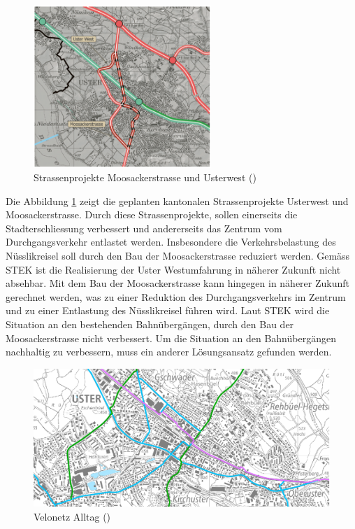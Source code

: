 \begin{figure}[h!]
	\centering
	\includegraphics[width=0.6\textwidth]{figures/f-04-04-UsterWest-Moosackerstr}
	\caption[Strassenprojekte Uster]{Strassenprojekte Moosackerstrasse und Usterwest (\cite{STEK})}
	\label{img:Strassenprojekte}
\end{figure}

Die Abbildung \ref{img:Strassenprojekte} zeigt die geplanten kantonalen Strassenprojekte Usterwest und Moosackerstrasse. Durch diese Strassenprojekte, sollen einerseits die Stadterschliessung verbessert und andererseits das Zentrum vom Durchgangsverkehr entlastet werden. Insbesondere die Verkehrsbelastung des Nüsslikreisel soll durch den Bau der Moosackerstrasse reduziert werden. Gemäss STEK ist die Realisierung der Uster Westumfahrung in näherer Zukunft nicht absehbar. Mit dem Bau der Moosackerstrasse kann hingegen in näherer Zukunft gerechnet werden, was zu einer Reduktion des Durchgangsverkehrs im Zentrum und zu einer Entlastung des Nüsslikreisel führen wird. Laut STEK wird die Situation an den bestehenden Bahnübergängen, durch den Bau der Moosackerstrasse nicht verbessert. Um die Situation an den Bahnübergängen nachhaltig zu verbessern, muss ein anderer Lösungsansatz gefunden werden. 

\begin{figure}[h!]
	\centering
	\includegraphics[width=\textwidth]{figures/f-04-01-Veloweg-Alltag}
	\caption[Velonetz Alltag]{Velonetz Alltag (\cite{GIS})}
	\label{img:Velonetz}
\end{figure}
 
